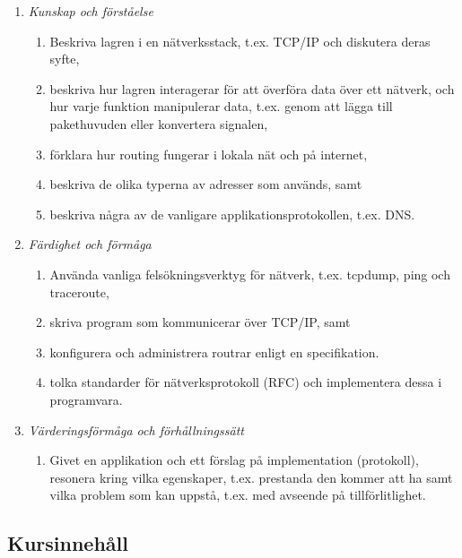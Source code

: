 \begin{enumerate}
\def\labelenumi{\Alph{enumi}.}
\tightlist
\item
  \emph{Kunskap och förståelse}

  \begin{enumerate}
  \def\labelenumii{\Alph{enumi}.\arabic{enumii}.}
  \tightlist
  \item
    Beskriva lagren i en nätverksstack, t.ex. TCP/IP och diskutera deras
    syfte,
  \item
    beskriva hur lagren interagerar för att överföra data över ett
    nätverk, och hur varje funktion manipulerar data, t.ex. genom att
    lägga till pakethuvuden eller konvertera signalen,
  \item
    förklara hur routing fungerar i lokala nät och på internet,
  \item
    beskriva de olika typerna av adresser som används, samt
  \item
    beskriva några av de vanligare applikationsprotokollen, t.ex. DNS.
  \end{enumerate}
\item
  \emph{Färdighet och förmåga}

  \begin{enumerate}
  \def\labelenumii{\Alph{enumi}.\arabic{enumii}.}
  \tightlist
  \item
    Använda vanliga felsökningsverktyg för nätverk, t.ex. tcpdump, ping
    och traceroute,
  \item
    skriva program som kommunicerar över TCP/IP, samt
  \item
    konfigurera och administrera routrar enligt en specifikation.
  \item
    tolka standarder för nätverksprotokoll (RFC) och implementera dessa
    i programvara.
  \end{enumerate}
\item
  \emph{Värderingsförmåga och förhållningssätt}

  \begin{enumerate}
  \def\labelenumii{\Alph{enumi}.\arabic{enumii}.}
  \tightlist
  \item
    Givet en applikation och ett förslag på implementation (protokoll),
    resonera kring vilka egenskaper, t.ex. prestanda den kommer att ha
    samt vilka problem som kan uppstå, t.ex. med avseende på
    tillförlitlighet.
  \end{enumerate}
\end{enumerate}

\subsection*{Kursinnehåll}

